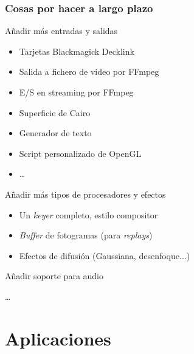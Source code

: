 \documentclass{beamer}
\begin{document}
\begin{frame}[t] \frametitle{Cosas por hacer a largo plazo}
	\begin{itemize}
		\begin{item}
			Añadir más entradas y salidas
			\begin{itemize}
				\item{Tarjetas Blackmagick Decklink}
				\item{Salida a fichero de video por FFmpeg}
				\item{E/S en streaming por FFmpeg}
				\item{Superficie de Cairo}
				\item{Generador de texto}
				\item{Script personalizado de OpenGL}
				\item{\ldots}
			\end{itemize}
		\end{item}
		\begin{item}
			Añadir más tipos de procesadores y efectos
			\begin{itemize}
				\item{Un \textit{keyer} completo, estilo compositor}
				\item{\textit{Buffer} de fotogramas (para \textit{replays})}
				\item{Efectos de difusión (Gaussiana, desenfoque...)}
			\end{itemize}
		\end{item}
		\begin{item}
			Añadir soporte para audio
		\end{item}
		\begin{item}
			\ldots
		\end{item}
	\end{itemize}
\end{frame}

%
%
\section{Aplicaciones}
\end{document}
